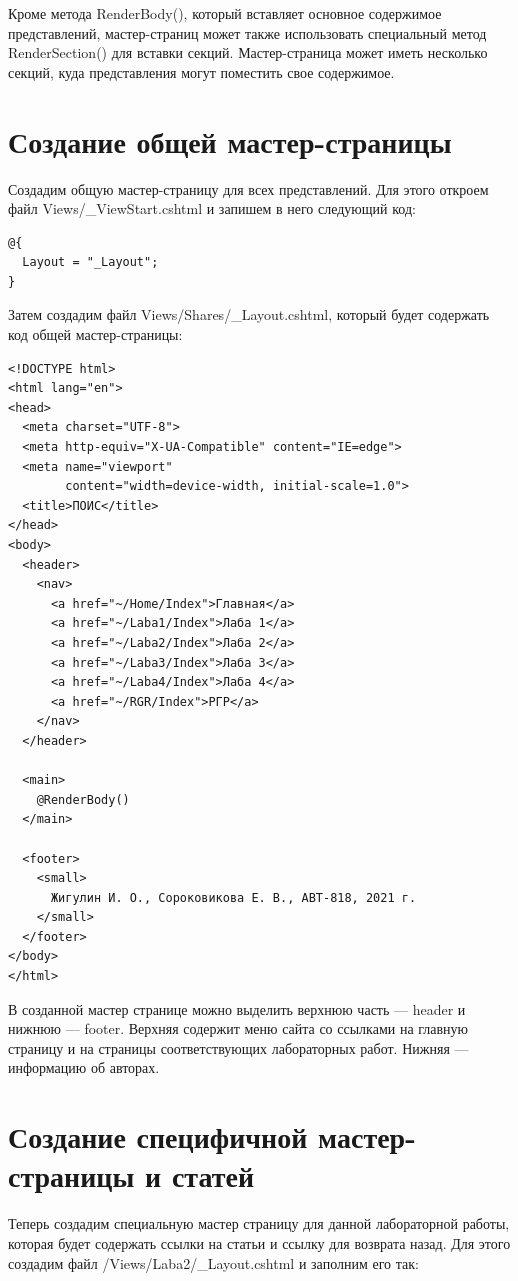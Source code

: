 \documentclass[a4paper,14pt]{extreport}
\begin{document}
Кроме метода RenderBody(), который вставляет основное содержимое представлений, мастер-страниц может также использовать специальный метод RenderSection() для вставки секций. Мастер-страница может иметь несколько секций, куда представления могут поместить свое содержимое.

\section{Создание общей мастер-страницы}
Создадим общую мастер-страницу для всех представлений. Для этого откроем файл Views/\_ViewStart.cshtml и запишем в него следующий код:

\begin{verbatim}
@{
  Layout = "_Layout";
}
\end{verbatim}


Затем создадим файл Views/Shares/\_Layout.cshtml, который будет содержать код общей мастер-страницы:

\begin{verbatim}
<!DOCTYPE html>
<html lang="en">
<head>
  <meta charset="UTF-8">
  <meta http-equiv="X-UA-Compatible" content="IE=edge">
  <meta name="viewport"
        content="width=device-width, initial-scale=1.0">
  <title>ПОИС</title>
</head>
<body>
  <header>
    <nav>
      <a href="~/Home/Index">Главная</a>
      <a href="~/Laba1/Index">Лаба 1</a>
      <a href="~/Laba2/Index">Лаба 2</a>
      <a href="~/Laba3/Index">Лаба 3</a>
      <a href="~/Laba4/Index">Лаба 4</a>
      <a href="~/RGR/Index">РГР</a>
    </nav>
  </header>

  <main>
    @RenderBody()
  </main>

  <footer>
    <small>
      Жигулин И. О., Сороковикова Е. В., АВТ-818, 2021 г.
    </small>
  </footer>
</body>
</html>
\end{verbatim}

В созданной мастер странице можно выделить верхнюю часть --- header и нижнюю --- footer. Верхняя содержит меню сайта со ссылками на главную страницу и на страницы соответствующих лабораторных работ. Нижняя --- информацию об авторах.

\section{Создание специфичной мастер-страницы и статей}
Теперь создадим специальную мастер страницу для данной лабораторной работы, которая будет содержать ссылки на статьи и ссылку для возврата назад. Для этого создадим файл /Views/Laba2/\_Layout.cshtml и заполним его так:
\end{document}
